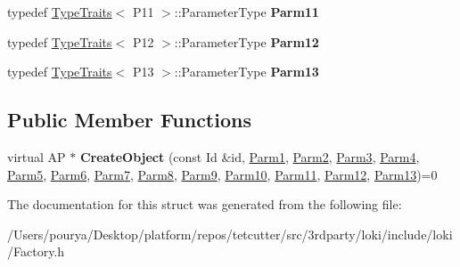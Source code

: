 \begin{DoxyCompactItemize}
\item 
\hypertarget{structLoki_1_1FactoryImpl_3_01AP_00_01Id_00_01Seq_3_01P1_00_01P2_00_01P3_00_01P4_00_01P5_00_01P627427229cbdd523be62dd804a58aab17_af2e62a5320c6ae884e134f9c23f670df}{}typedef \hyperlink{classLoki_1_1TypeTraits}{Type\+Traits}$<$ P11 $>$\+::Parameter\+Type {\bfseries Parm11}\label{structLoki_1_1FactoryImpl_3_01AP_00_01Id_00_01Seq_3_01P1_00_01P2_00_01P3_00_01P4_00_01P5_00_01P627427229cbdd523be62dd804a58aab17_af2e62a5320c6ae884e134f9c23f670df}

\item 
\hypertarget{structLoki_1_1FactoryImpl_3_01AP_00_01Id_00_01Seq_3_01P1_00_01P2_00_01P3_00_01P4_00_01P5_00_01P627427229cbdd523be62dd804a58aab17_a23de44d7706dc83d23d96edbd3b191b0}{}typedef \hyperlink{classLoki_1_1TypeTraits}{Type\+Traits}$<$ P12 $>$\+::Parameter\+Type {\bfseries Parm12}\label{structLoki_1_1FactoryImpl_3_01AP_00_01Id_00_01Seq_3_01P1_00_01P2_00_01P3_00_01P4_00_01P5_00_01P627427229cbdd523be62dd804a58aab17_a23de44d7706dc83d23d96edbd3b191b0}

\item 
\hypertarget{structLoki_1_1FactoryImpl_3_01AP_00_01Id_00_01Seq_3_01P1_00_01P2_00_01P3_00_01P4_00_01P5_00_01P627427229cbdd523be62dd804a58aab17_a5c063856e06ea90f900e24b6f53177b2}{}typedef \hyperlink{classLoki_1_1TypeTraits}{Type\+Traits}$<$ P13 $>$\+::Parameter\+Type {\bfseries Parm13}\label{structLoki_1_1FactoryImpl_3_01AP_00_01Id_00_01Seq_3_01P1_00_01P2_00_01P3_00_01P4_00_01P5_00_01P627427229cbdd523be62dd804a58aab17_a5c063856e06ea90f900e24b6f53177b2}

\end{DoxyCompactItemize}
\subsection*{Public Member Functions}
\begin{DoxyCompactItemize}
\item 
\hypertarget{structLoki_1_1FactoryImpl_3_01AP_00_01Id_00_01Seq_3_01P1_00_01P2_00_01P3_00_01P4_00_01P5_00_01P627427229cbdd523be62dd804a58aab17_a52b5b369f14a9bc55923ed4a2e2a0678}{}virtual A\+P $\ast$ {\bfseries Create\+Object} (const Id \&id, \hyperlink{classLoki_1_1EmptyType}{Parm1}, \hyperlink{classLoki_1_1EmptyType}{Parm2}, \hyperlink{classLoki_1_1EmptyType}{Parm3}, \hyperlink{classLoki_1_1EmptyType}{Parm4}, \hyperlink{classLoki_1_1EmptyType}{Parm5}, \hyperlink{classLoki_1_1EmptyType}{Parm6}, \hyperlink{classLoki_1_1EmptyType}{Parm7}, \hyperlink{classLoki_1_1EmptyType}{Parm8}, \hyperlink{classLoki_1_1EmptyType}{Parm9}, \hyperlink{classLoki_1_1EmptyType}{Parm10}, \hyperlink{classLoki_1_1EmptyType}{Parm11}, \hyperlink{classLoki_1_1EmptyType}{Parm12}, \hyperlink{classLoki_1_1EmptyType}{Parm13})=0\label{structLoki_1_1FactoryImpl_3_01AP_00_01Id_00_01Seq_3_01P1_00_01P2_00_01P3_00_01P4_00_01P5_00_01P627427229cbdd523be62dd804a58aab17_a52b5b369f14a9bc55923ed4a2e2a0678}

\end{DoxyCompactItemize}


The documentation for this struct was generated from the following file\+:\begin{DoxyCompactItemize}
\item 
/\+Users/pourya/\+Desktop/platform/repos/tetcutter/src/3rdparty/loki/include/loki/Factory.\+h\end{DoxyCompactItemize}
